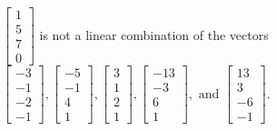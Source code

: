 \begin{exercise}
\begin{exerciseStatement}
  \end{exerciseStatement}
  \begin{exerciseAnswer}
   \(\left[\begin{array}{c}
1 \\
5 \\
7 \\
0
\end{array}\right]\) 
  	 is not  
	a linear combination of the vectors \(\left[\begin{array}{c}
-3 \\
-1 \\
-2 \\
-1
\end{array}\right] , \left[\begin{array}{c}
-5 \\
-1 \\
4 \\
1
\end{array}\right] , \left[\begin{array}{c}
3 \\
1 \\
2 \\
1
\end{array}\right] , \left[\begin{array}{c}
-13 \\
-3 \\
6 \\
1
\end{array}\right] , \text{ and } \left[\begin{array}{c}
13 \\
3 \\
-6 \\
-1
\end{array}\right]\).

	
  


  \end{exerciseAnswer}
\end{exercise}